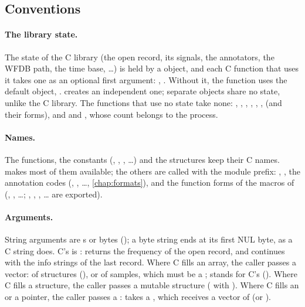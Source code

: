 \subsection{Conventions}

\paragraph{The library state.} The state of the C library (the open record, its signals,
the annotators, the WFDB path, the time base, \ldots) is held by a  object, and
each C function that uses it takes one as an optional first argument:
, . Without it, the function uses the
default object, .  creates an independent one; separate objects
share no state, unlike the C library. The functions that use no state take none:
, , , ,
, ,  (and their  forms), and
 and , whose count belongs to
the process.

\paragraph{Names.} The functions, the constants (,
, , \ldots) and the structures keep their C
names.  makes most of them available; the others are called with the
module prefix: , , the annotation codes
(, , \ldots, \cref{chap:formats}), and the function
forms of the macros of  (,
, \ldots; , , , \ldots{} are
exported).

\paragraph{Arguments.} String arguments are s or bytes (); a
byte string ends at its first NUL byte, as a C string does. C's  is
:  returns the frequency of the open record, and
 continues with the info strings of the last record. Where C fills
an array, the caller passes a vector: of  structures (), or of samples, which must be a ;  stands
for C's  (). Where C fills a structure, the
caller passes a mutable structure ( with ).
Where C fills an  or a pointer, the caller passes a :
 takes a , which receives a vector of  (or
).

